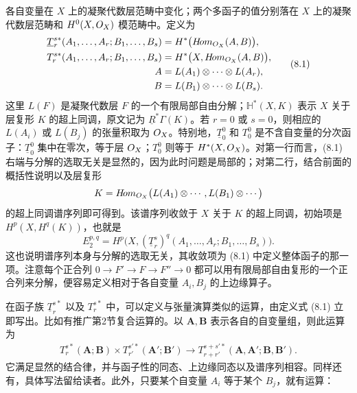 各自变量在 $X$ 上的凝聚代数层范畴中变化；两个多函子的值分别落在 $X$ 上的凝聚代数层范畴和 $H^0(X,O_X)$ 模范畴中。定义为
\begin{equation}
\begin{aligned}
\underline T_r^{s*}(A_1,\ldots,A_r;B_1,\ldots,B_s)
&=H^*\bigl(H\!om_{O_X}(A,B)\bigr),\\
T_r^{s*}(A_1,\ldots,A_r;B_1,\ldots,B_s)
&=H^*\bigl(X,H\!om_{O_X}(A,B)\bigr),\\
A&=L(A_1)\otimes\cdots\otimes L(A_r),\\
B&=L(B_1)\otimes\cdots\otimes L(B_s).
\end{aligned}\tag{8.1}
\end{equation}
这里 $L(F)$ 是凝聚代数层 $F$ 的一个有限局部自由分解；$\mathbb H^*(X,K)$ 表示 $X$ 关于层复形 $K$ 的超上同调，原文记为 $\underline R^*\Gamma(K)$。若 $r=0$ 或 $s=0$，则相应的 $L(A_i)$ 或 $L(B_j)$ 的张量积取为 $O_X$。特别地，$\underline T_0^0$ 和 $T_0^0$ 是不含自变量的分次函子：$\underline T_0^0$ 集中在零次，等于层 $O_X$；$T_0^0$ 则等于 $H^*(X,O_X)$。对第一行而言，(8.1) 右端与分解的选取无关是显然的，因为此时问题是局部的；对第二行，结合前面的概括性说明以及层复形
\[
K=H\!om_{O_X}\bigl(L(A_1)\otimes\cdots,L(B_1)\otimes\cdots\bigr)
\]
的超上同调谱序列即可得到。该谱序列收敛于 $X$ 关于 $K$ 的超上同调，初始项是 $H^p(X,H^q(K))$，也就是
\begin{equation}
E_2^{p,q}=H^p\bigl(X,(\underline T_r^s)^q(A_1,\ldots,A_r;B_1,\ldots,B_s)\bigr).
\tag{8.2}
\end{equation}
这也说明谱序列本身与分解的选取无关，其收敛项为 (8.1) 中定义整体函子的那一项。注意每个正合列 $0\to F'\to F\to F''\to0$ 都可以用有限局部自由复形的一个正合列来分解，便容易定义相对于各自变量 $A_i,B_j$ 的上边缘算子。

在函子族 $\underline T_r^{s*}$ 以及 $T_r^{s*}$ 中，可以定义与张量演算类似的运算，由定义式 (8.1) 立即写出。比如有推广第2节复合运算的。以 $\mathbf A,\mathbf B$ 表示各自的自变量组，则此运算为
\begin{equation}
\begin{aligned}
T_r^{s*}(\mathbf A;\mathbf B)\times T_{r'}^{s'*}(\mathbf A';\mathbf B')
\longrightarrow T_{r+r'}^{s+s'*}(\mathbf A,\mathbf A';\mathbf B,\mathbf B').
\end{aligned}\tag{8.3}
\end{equation}
它满足显然的结合律，并与函子性的同态、上边缘同态以及谱序列相容。同样还有，具体写法留给读者。此外，只要某个自变量 $A_i$ 等于某个 $B_j$，就有运算：

